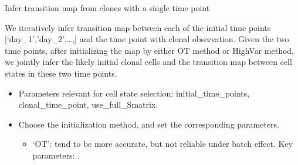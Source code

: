 \documentclass[letterpaper,10pt,english]{sphinxmanual}
\begin{document}
\begin{fulllineitems}
\label{\detokenize{cospar.tmap.infer_Tmap_from_one_time_clones:cospar.tmap.infer_Tmap_from_one_time_clones}}
Infer transition map from clones with a single time point

We iteratively infer transition map between each of the initial
time points {[}‘day\_1’,’day\_2’,…,{]} and the time point with clonal
observation. Given the two time points, after initializing the map
by either OT method or HighVar method, we jointly infer the likely
initial clonal cells and the transition map between cell states
in these two time points.

\begin{itemize}
\item {} 
Parameters relevant for cell state selection:  initial\_time\_points,
clonal\_time\_point, use\_full\_Smatrix.

\item {} 
Choose the initialization method, and set the corresponding parameters.
\begin{itemize}
\item {} 
‘OT’: tend to be more accurate, but not reliable
under batch effect. Key parameters: .


\end{itemize}
\end{itemize}
\end{fulllineitems}
\end{document}

